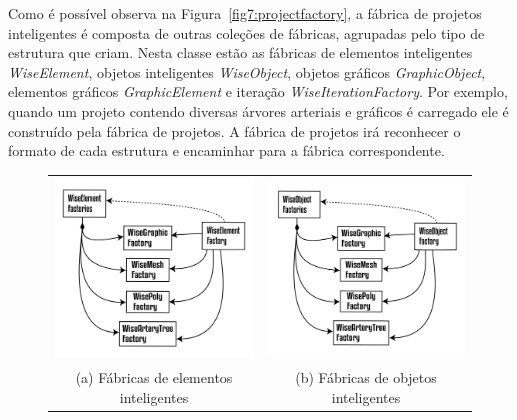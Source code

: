\documentclass[a4paper,12pt]{monografia}
\theoremstyle{plain}
\theoremstyle{definition}
\theoremstyle{remark}
\begin{document}
Como é possível observa na Figura~\ref{fig7:projectfactory}, a fábrica de projetos inteligentes é composta de outras coleções de fábricas, agrupadas pelo tipo de estrutura que criam. Nesta classe estão as fábricas de elementos inteligentes \textit{WiseElement}, objetos inteligentes \textit{WiseObject}, objetos gráficos \textit{GraphicObject}, elementos gráficos \textit{GraphicElement} e iteração \textit{WiseIterationFactory}. Por exemplo, quando um projeto contendo diversas árvores arteriais e gráficos é carregado ele é construído pela fábrica de projetos. A fábrica de projetos irá reconhecer o formato de cada estrutura e encaminhar para a fábrica correspondente.

\begin{figure}
	\begin{tabular}{cc}
		\includegraphics[width=65mm]{Figures/WiseElementFactories.png} &   \includegraphics[width=65mm]{Figures/WiseObjectFactories.png} \\
		(a) Fábricas de elementos inteligentes & (b) Fábricas de objetos inteligentes \\[6pt]

\end{tabular}
\end{figure}
\end{document}

